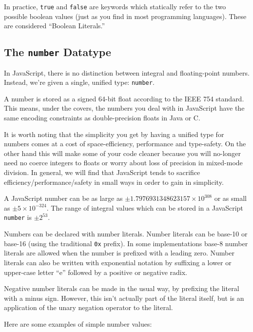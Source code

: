 \documentclass[11pt,letter]{book}
\begin{document}
    In practice, \texttt{true} and \texttt{false} are keywords which  statically refer to the two 
    possible boolean values (just as you find in most programming languages). These are considered 
    ``Boolean Literals.''
    
    \subsection{The \texttt{number} Datatype}
    In JavaScript, there is no distinction between integral and floating-point numbers. Instead, 
    we're given a single, unified type: \texttt{number}.
    
    A number is stored as a signed 64-bit float according to the IEEE 754 standard. This means, 
    under the covers, the numbers you deal with in JavaScript have the same encoding constraints as 
    double-precision floats in Java or C.
    
    It is worth noting that the simplicity you get by having a unified type for numbers comes at 
    a cost of space-efficiency, performance and type-safety. On the other hand this will make 
    some of your code cleaner because you will no-longer need no coerce integers to floats or 
    worry about loss of precision in mixed-mode division. In general, we will find that 
    JavaScript tends to sacrifice efficiency/performance/safety in small ways in order to gain 
    in simplicity.
    
    A JavaScript number can be as large as $\pm 1.7976931348623157 \times 10^{308}$ or as small as
    $\pm 5 \times 10^{-324}$. The range of integral values which can be stored in a JavaScript 
    \texttt{number} is $\pm 2^{53}$.
    
    Numbers can be declared with number literals. Number literals can be base-10 or base-16 (using 
    the traditional \texttt{0x} prefix). In some implementations base-8 number literals are allowed 
    when the number is prefixed with a leading zero. Number literals can also be written with 
    exponential notation by suffixing a lower or upper-case letter ``e'' followed by a positive or 
    negative radix. 
    
    Negative number literals can be made in the usual way, by prefixing the literal with a minus 
    sign. However, this isn't actually part of the literal itself, but is an application of the 
    unary negation operator to the literal.
    
    Here are some examples of simple number values:
    
\end{document}
